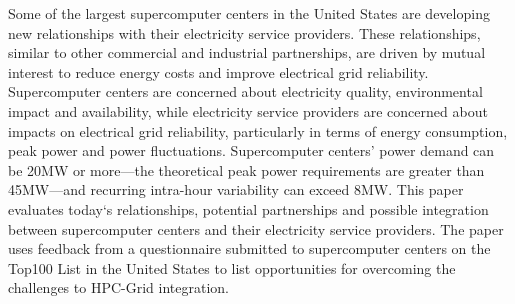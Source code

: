 Some of the largest supercomputer centers in the United States are developing 
new relationships with their electricity service providers. 
These relationships, similar to other commercial and industrial partnerships, are 
driven by mutual interest to reduce energy costs and improve electrical grid reliability.
Supercomputer centers are concerned about electricity quality, environmental 
impact and availability,
while electricity service providers are concerned about impacts
on electrical grid reliability, particularly in terms of energy consumption, peak power and power fluctuations.
Supercomputer centers' power demand can be 20MW or more---the 
theoretical peak power requirements are greater than 45MW---and recurring 
intra-hour variability can exceed 8MW.
This paper evaluates today`s relationships, potential partnerships and possible 
integration between supercomputer centers and their electricity service providers.
The paper uses feedback from a questionnaire submitted to supercomputer centers 
on the Top100 List in the United States to list opportunities for overcoming the 
challenges to HPC-Grid integration.

